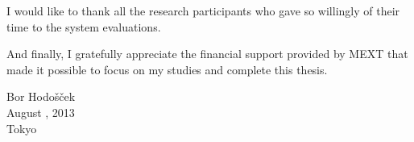 I would like to thank all the research participants who gave so willingly of their time to the system evaluations.

And finally, I gratefully appreciate the financial support provided by MEXT that made it possible to focus on my studies and complete this thesis.

\vspace{1cm}

\hfill Bor Hodošček\\

\hfill August \hspace{-1em} , 2013\\

\hfill Tokyo





%
%
%

\endgroup
